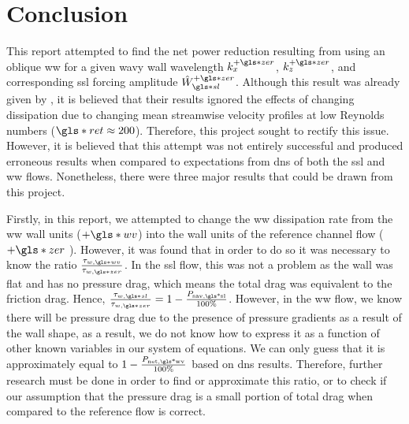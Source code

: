 \chapter{Conclusion}\glsresetall
This report attempted to find the net power reduction resulting from using an oblique \gls*{ww} for a given wavy wall wavelength $k_x\pz$,  $k_z\pz$, and corresponding  \gls*{ssl} forcing amplitude $\hat{W}\pz\ssl$. Although this result was already given by \sct, it is believed that their results ignored the effects of changing dissipation due to changing mean streamwise velocity profiles at low Reynolds numbers ($\gls*{ret}\approx200$). Therefore, this project sought to rectify this issue. However, it is believed that this attempt was not entirely successful and produced erroneous results when compared to expectations from \gls*{dns} of both the \gls*{ssl} and \gls*{ww} flows. Nonetheless, there were three major results that could be drawn from this project.

Firstly, in this report, we attempted to change the \gls*{ww} dissipation rate from the \gls*{ww} wall units ($+\gls*{wv}$) into the wall units of the reference channel flow ($+\gls*{zer}$ ). However, it was found that in order to do so it was necessary to know the ratio $\frac{\tau_{w,\gls*{wv}}}{\tau_{w,\gls*{zer}}}$. In the \gls*{ssl} flow, this was not a problem as the wall was flat and has no pressure drag, which means the total drag was equivalent to the friction drag. Hence, $\frac{\tau_{w,\gls*{sl}}}{\tau_{w,\gls*{zer}}}=1-\frac{P_\text{sav,\gls*{sl}} }{100\%}$. However, in the \gls*{ww} flow, we know there will be pressure drag due to the presence of pressure gradients as a result of the wall shape, as a result, we do not know how to express it as a function of other known variables in our system of equations. We can only guess that it is approximately equal to $1-\frac{P_\text{net,\gls*{wv}} }{100\%}$ based on \gls*{dns} results. Therefore, further research must be done in order to find or approximate this ratio, or to check if our assumption that the pressure drag is a small portion of total drag when compared to the reference flow is correct.

